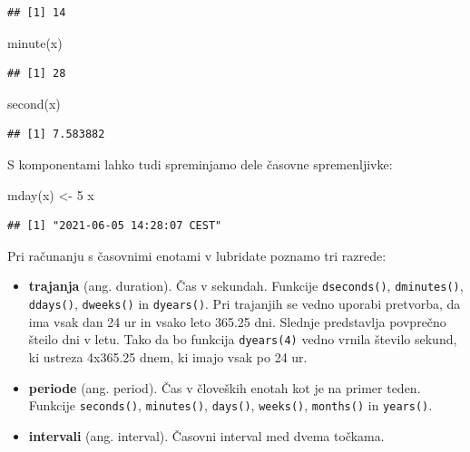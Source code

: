 \documentclass[
]{book}
\newenvironment{Shaded}{\begin{snugshade}}{\end{snugshade}}
\newcommand{\DecValTok}[1]{\textcolor[rgb]{0.00,0.00,0.81}{#1}}
\newcommand{\FunctionTok}[1]{\textcolor[rgb]{0.00,0.00,0.00}{#1}}
\newcommand{\NormalTok}[1]{#1}
\newcommand{\OtherTok}[1]{\textcolor[rgb]{0.56,0.35,0.01}{#1}}
\providecommand{\tightlist}{%
  \setlength{\itemsep}{0pt}\setlength{\parskip}{0pt}}
\begin{document}
\begin{verbatim}
## [1] 14
\end{verbatim}

\begin{Shaded}
\begin{Highlighting}[]
\FunctionTok{minute}\NormalTok{(x)}
\end{Highlighting}
\end{Shaded}

\begin{verbatim}
## [1] 28
\end{verbatim}

\begin{Shaded}
\begin{Highlighting}[]
\FunctionTok{second}\NormalTok{(x)}
\end{Highlighting}
\end{Shaded}

\begin{verbatim}
## [1] 7.583882
\end{verbatim}

S komponentami lahko tudi spreminjamo dele časovne spremenljivke:

\begin{Shaded}
\begin{Highlighting}[]
\FunctionTok{mday}\NormalTok{(x) }\OtherTok{\textless{}{-}} \DecValTok{5}
\NormalTok{x}
\end{Highlighting}
\end{Shaded}

\begin{verbatim}
## [1] "2021-06-05 14:28:07 CEST"
\end{verbatim}

Pri računanju s časovnimi enotami v lubridate poznamo tri razrede:

\begin{itemize}
\tightlist
\item
  \textbf{trajanja} (ang. duration). Čas v sekundah. Funkcije \texttt{dseconds()}, \texttt{dminutes()}, \texttt{ddays()}, \texttt{dweeks()} in \texttt{dyears()}. Pri trajanjih se vedno uporabi pretvorba, da ima vsak dan 24 ur in vsako leto 365.25 dni. Slednje predstavlja povprečno šteilo dni v letu. Tako da bo funkcija \texttt{dyears(4)} vedno vrnila število sekund, ki ustreza 4x365.25 dnem, ki imajo vsak po 24 ur.
\item
  \textbf{periode} (ang. period). Čas v človeških enotah kot je na primer teden. Funkcije \texttt{seconds()}, \texttt{minutes()}, \texttt{days()}, \texttt{weeks()}, \texttt{months()} in \texttt{years()}.
\item
  \textbf{intervali} (ang. interval). Časovni interval med dvema točkama.
\end{itemize}
\end{document}

